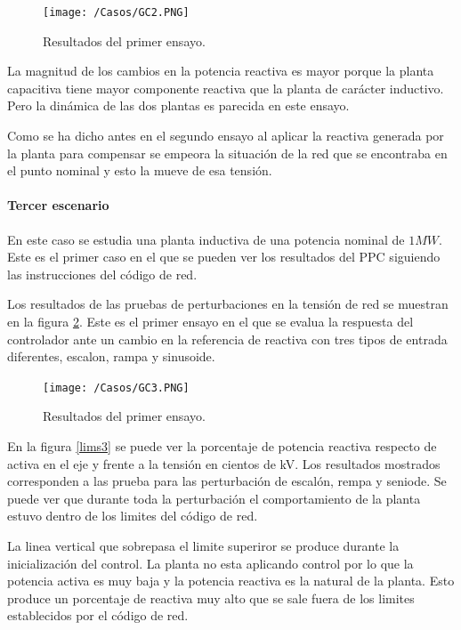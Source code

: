 \documentclass{book}
\begin{document}
\begin{figure}[h!]
\centering
\texttt{[image: /Casos/GC2.PNG]}
\caption{Resultados del primer ensayo. }
\label{GC2}
\end{figure} \par

La magnitud de los cambios en la potencia reactiva es mayor porque la planta capacitiva tiene mayor componente reactiva que la planta de car\'acter inductivo. Pero la din\'amica de las dos plantas es parecida en este ensayo. \par

Como se ha dicho antes en el segundo ensayo al aplicar  la reactiva generada por la planta para compensar se empeora la situaci\'on de la red que se encontraba en el punto nominal y esto la mueve de esa tensi\'on. \par

	\paragraph{Tercer escenario}

En este caso se estudia una planta inductiva de una potencia nominal de $1MW$. Este es el primer caso en el que se pueden ver los resultados del PPC siguiendo las instrucciones del c\'odigo de red. \par

Los resultados de las pruebas de perturbaciones en la tensi\'on de red se muestran en la figura \ref{GC3}. Este es el primer ensayo en el que se evalua la respuesta del controlador ante un cambio en la referencia de reactiva con tres tipos de entrada diferentes, escalon, rampa y sinusoide. \par

\begin{figure}[h!]
\centering
\texttt{[image: /Casos/GC3.PNG]}
\caption{Resultados del primer ensayo. }
\label{GC3}
\end{figure} \par

En la figura \ref{lims3} se puede ver la porcentaje de potencia reactiva respecto de activa en el eje y frente a la tensi\'on en cientos de kV. Los resultados mostrados corresponden a las prueba para las perturbaci\'on de escal\'on, rempa y seniode. Se puede ver que durante toda la perturbaci\'on el comportamiento de la planta estuvo dentro de los limites del c\'odigo de red. \par

La linea vertical que sobrepasa el limite superiror se produce durante la inicializaci\'on del control. La planta no esta aplicando control por lo que la potencia activa es muy baja y la potencia reactiva es la natural de la planta. Esto produce un porcentaje de reactiva muy alto que se sale fuera de los limites establecidos por el c\'odigo de red. \par  
\end{document}
